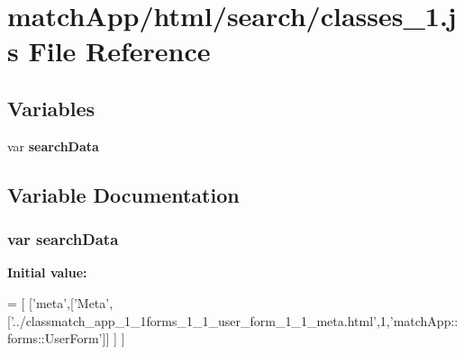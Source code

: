 \section{match\+App/html/search/classes\+\_\+1.js File Reference}
\label{classes__1_8js}
\subsection*{Variables}
\begin{DoxyCompactItemize}
\item 
var {\bf search\+Data}
\end{DoxyCompactItemize}


\subsection{Variable Documentation}
\subsubsection[{search\+Data}]{\setlength{\rightskip}{0pt plus 5cm}var search\+Data}\label{classes__1_8js_ad01a7523f103d6242ef9b0451861231e}
{\bfseries Initial value\+:}
\begin{DoxyCode}
=
[
  [\textcolor{stringliteral}{'meta'},[\textcolor{stringliteral}{'Meta'},[\textcolor{stringliteral}{'../classmatch\_app\_1\_1forms\_1\_1\_user\_form\_1\_1\_meta.html'},1,\textcolor{stringliteral}{'matchApp::forms::UserForm'}]]
      ]
]
\end{DoxyCode}

